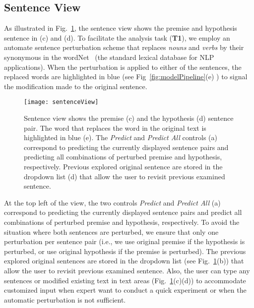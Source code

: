 \subsection{Sentence View}
\label{sec:sentence}
As illustrated in Fig.~\ref{fig:sentenceView}, the sentence view shows the premise and hypothesis sentence in (c) and (d).
%
To facilitate the analysis task (\textbf{T1}), we employ an automate sentence perturbation scheme that replaces \emph{nouns} and \emph{verbs} by their synonymous in the wordNet~\cite{Miller1995} (the standard lexical database for NLP applications).
%
When the perturbation is applied to either of the sentences, the replaced words are highlighted in blue (see Fig~\ref{fig:modelPipeline}(e) ) to signal the modification made to the original sentence.

\begin{figure}[htbp]
\centering
\vspace{-2mm}
 \texttt{[image: sentenceView]}
 \vspace{-2mm}
 \caption{
 Sentence view shows the premise (c) and the hypothesis (d) sentence pair. The word that replaces the word in the original text is highlighted in blue (e).
 The \emph{Predict} and \emph{Predict All} controls (a) correspond to predicting the currently displayed sentence pairs and predicting all combinations of perturbed premise and hypothesis, respectively.
 Previous explored original sentence are stored in the dropdown list (d) that allow the user to revisit previous examined sentence.
}
\label{fig:sentenceView}
\end{figure}

At the top left of the view, the two controls \emph{Predict} and \emph{Predict All} (a) correspond to predicting the currently displayed sentence pairs and predict all combinations of perturbed premise and hypothesis, respectively.
%
To avoid the situation where both sentences are perturbed, we ensure that only one perturbation per sentence pair (i.e., we use original premise if the hypothesis is perturbed, or use original hypothesis if the premise is perturbed).
The previous explored original sentences are stored in the dropdown list (see Fig.~\ref{fig:sentenceView}(b)) that allow the user to revisit previous examined sentence.
Also, the user can type any sentences or modified existing text in text areas (Fig.~\ref{fig:sentenceView}(c)(d)) to accommodate customized input when expert want to conduct a quick experiment or when the automatic perturbation is not sufficient.




